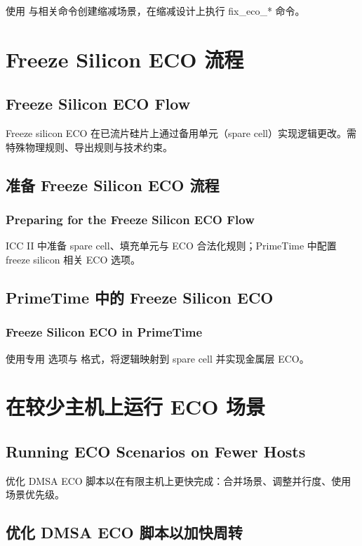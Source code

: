 使用  与相关命令创建缩减场景，在缩减设计上执行 fix_eco_* 命令。

\section{Freeze Silicon ECO 流程}
\subsection*{Freeze Silicon ECO Flow}

Freeze silicon ECO 在已流片硅片上通过备用单元（spare cell）实现逻辑更改。需特殊物理规则、导出规则与技术约束。

\subsection{准备 Freeze Silicon ECO 流程}
\subsubsection*{Preparing for the Freeze Silicon ECO Flow}

ICC II 中准备 spare cell、填充单元与 ECO 合法化规则；PrimeTime 中配置 freeze silicon 相关 ECO 选项。

\subsection{PrimeTime 中的 Freeze Silicon ECO}
\subsubsection*{Freeze Silicon ECO in PrimeTime}

使用专用  选项与  格式，将逻辑映射到 spare cell 并实现金属层 ECO。

\section{在较少主机上运行 ECO 场景}
\subsection*{Running ECO Scenarios on Fewer Hosts}

优化 DMSA ECO 脚本以在有限主机上更快完成：合并场景、调整并行度、使用场景优先级。

\subsection{优化 DMSA ECO 脚本以加快周转}
